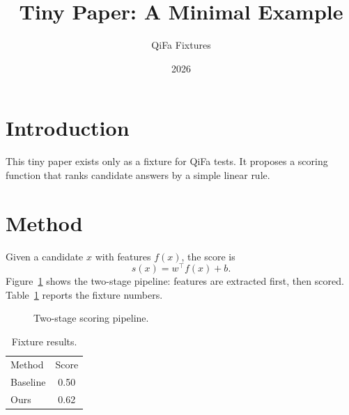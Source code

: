 \documentclass{article}
\title{Tiny Paper: A Minimal Example}
\author{QiFa Fixtures}
\date{2026}
\begin{document}
\maketitle

\section{Introduction}
This tiny paper exists only as a fixture for QiFa tests. It proposes a
scoring function that ranks candidate answers by a simple linear rule.

\section{Method}
Given a candidate $x$ with features $f(x)$, the score is
\begin{equation}
s(x) = w^\top f(x) + b .
\label{eq:score}
\end{equation}
Figure~\ref{fig:arch} shows the two-stage pipeline: features are extracted
first, then scored. Table~\ref{tab:results} reports the fixture numbers.

\begin{figure}[h]
  \centering
  \caption{Two-stage scoring pipeline.}
  \label{fig:arch}
\end{figure}

\begin{table}[h]
  \centering
  \begin{tabular}{lc}
    Method & Score \\
    Baseline & 0.50 \\
    Ours & 0.62 \\
  \end{tabular}
  \caption{Fixture results.}
  \label{tab:results}
\end{table}
\end{document}
